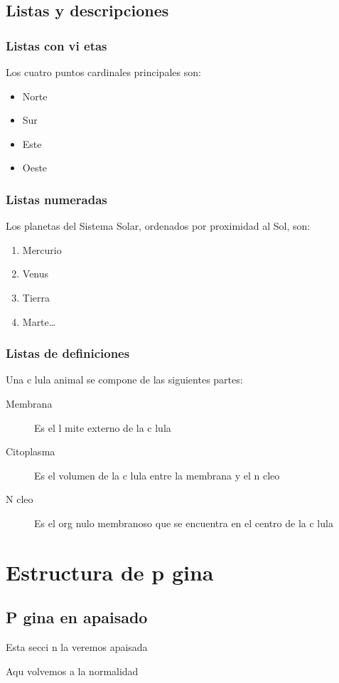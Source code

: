 \documentclass{article}
\begin{document}
\subsection{Listas y descripciones}
\label{sec:listasdescripciones}

\subsubsection{Listas con vi etas}
\label{sec:listasvi etas}

Los cuatro puntos cardinales principales son:
\begin{itemize}
\item Norte
\item Sur
\item Este
\item Oeste
\end{itemize}

\subsubsection{Listas numeradas}
\label{sec:listasnumeradas}

Los planetas del Sistema Solar, ordenados por proximidad al Sol, son:
\begin{enumerate}
\item Mercurio
\item Venus
\item Tierra
\item Marte\ldots{}
\end{enumerate}

\subsubsection{Listas de definiciones}
\label{sec:listasdefiniciones}

Una c lula animal se compone de las siguientes partes:
\begin{description}
\item[Membrana] Es el l mite externo de la c lula
\item[Citoplasma] Es el volumen de la c lula entre la membrana y el n cleo
\item[N cleo] Es el org nulo membranoso que se encuentra en el centro de la c lula
\end{description}
\newpage{}
\section{Estructura de p gina}
\label{sec:estructurapagina}
\layout{}

\thispagestyle{empty}
\begin{landscape}
\thispagestyle{empty}
  \subsection{P gina en apaisado}
  \label{sec:apaisado}
Esta secci n la veremos apaisada
  
\end{landscape}
\newpage
Aqu  volvemos a la normalidad
\end{document}
